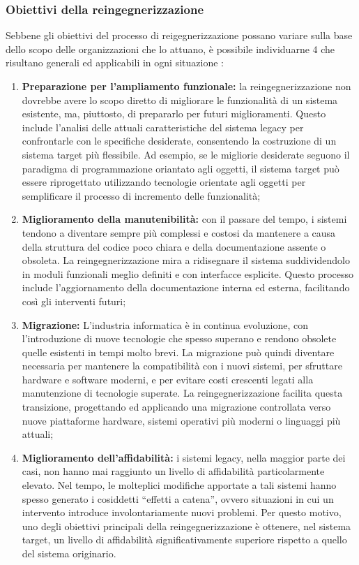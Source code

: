 \subsubsection{Obiettivi della reingegnerizzazione}
Sebbene gli obiettivi del processo di reigegnerizzazione possano variare sulla base dello scopo delle organizzazioni che lo attuano, è possibile individuarne 4 che risultano generali ed applicabili in ogni situazione \cite{rosenberg1996software}:
\begin{enumerate}
  \item \textbf{Preparazione per l'ampliamento funzionale:} la reingegnerizzazione non dovrebbe avere lo scopo diretto di migliorare le funzionalità di un sistema esistente, ma, piuttosto, di prepararlo per futuri miglioramenti. Questo include l'analisi delle attuali caratteristiche del sistema legacy per confrontarle con le specifiche desiderate, consentendo la costruzione di un sistema target più flessibile. Ad esempio, se le migliorie desiderate seguono il paradigma di programmazione oriantato agli oggetti, il sistema target può essere riprogettato utilizzando tecnologie orientate agli oggetti per semplificare il processo di incremento delle funzionalità;

  \item \textbf{Miglioramento della manutenibilità:} con il passare del tempo, i sistemi tendono a diventare sempre più complessi e costosi da mantenere a causa della struttura del codice poco chiara e della documentazione assente o obsoleta. La reingegnerizzazione mira a ridisegnare il sistema suddividendolo in moduli funzionali meglio definiti e con interfacce esplicite. Questo processo include l'aggiornamento della documentazione interna ed esterna, facilitando così gli interventi futuri;

  \item \textbf{Migrazione:} L'industria informatica è in continua evoluzione, con l'introduzione di nuove tecnologie che spesso superano e rendono obsolete quelle esistenti in tempi molto brevi. La migrazione può quindi diventare necessaria per mantenere la compatibilità con i nuovi sistemi, per sfruttare hardware e software moderni, e per evitare costi crescenti legati alla manutenzione di tecnologie superate. La reingegnerizzazione facilita questa transizione, progettando ed applicando una migrazione controllata verso nuove piattaforme hardware, sistemi operativi più moderni o linguaggi più attuali;

  \item \textbf{Miglioramento dell'affidabilità:} i sistemi legacy, nella maggior parte dei casi, non hanno mai raggiunto un livello di affidabilità particolarmente elevato. Nel tempo, le molteplici modifiche apportate a tali sistemi hanno spesso generato i cosiddetti ``effetti a catena'', ovvero situazioni in cui un intervento introduce involontariamente nuovi problemi. Per questo motivo, uno degli obiettivi principali della reingegnerizzazione è ottenere, nel sistema target, un livello di affidabilità significativamente superiore rispetto a quello del sistema originario.
\end{enumerate}

